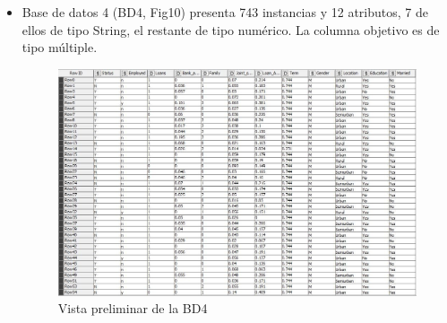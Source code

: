 \begin{itemize}
\item Base de datos 4 (BD4, Fig10) presenta 743 instancias y 12 atributos, 7 de ellos de tipo String, el restante de tipo numérico. La columna objetivo es de tipo múltiple.
\begin{figure}[H]
	\centering
	\includegraphics[width=0.6\linewidth]{"figuras/capi 3/bd4"}
	\caption{Vista preliminar de la BD4}
	\label{fig:bd4}
\end{figure}

\end{itemize}

